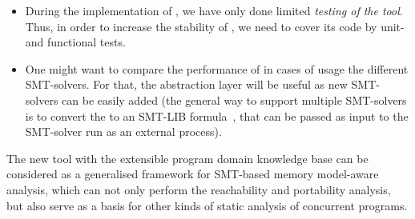 \begin{itemize}[leftmargin=\parindent]
\item During the implementation of \porthos[2], we have only done limited \textit{testing of the tool}.
Thus, in order to increase the stability of \porthos[2], we need to cover its code by unit- and functional tests.

\item One might want to compare the performance of \porthos[2] in cases of usage the different SMT-solvers.
For that, the \zformula{} abstraction layer will be useful as new SMT-solvers can be easily added (the general way to support multiple SMT-solvers is to convert the \zformula{} to an SMT-LIB formula~\cite{smt-lib}, that can be passed as input to the SMT-solver run as an external process).







\end{itemize}


The new tool \porthos[2] with the extensible program domain knowledge base can be considered as a generalised framework for SMT-based memory model-aware analysis, which can not only perform the reachability and portability analysis, but also serve as a basis for other kinds of static analysis of concurrent programs.
